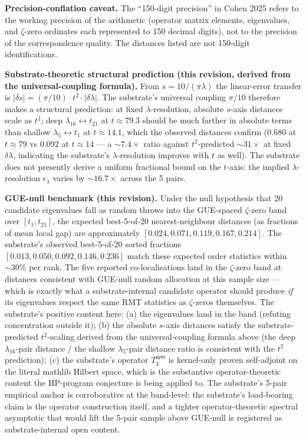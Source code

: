 \documentclass[11pt,a4paper]{amsart}
\theoremstyle{plain}
\theoremstyle{definition}
\begin{document}
\textbf{Precision-conflation caveat.} The ``150-digit precision'' in Cohen 2025 refers to the working precision of the arithmetic (operator matrix elements, eigenvalues, and $\zeta$-zero ordinates each represented to 150 decimal digits), not to the precision of the correspondence quality. The distances listed are not 150-digit identifications.

\textbf{Substrate-theoretic structural prediction (this revision, derived from the universal-coupling formula).} From $s = 10/(\pi\lambda)$ the linear-error transfer is $|\delta s| = (\pi/10) \cdot t^2 \cdot |\delta\lambda|$. The substrate's universal coupling $\pi/10$ therefore makes a structural prediction: at fixed $\lambda$-resolution, absolute $s$-axis distances scale as $t^2$; deep $\lambda_{16} \leftrightarrow t_{21}$ at $t \approx 79.3$ should be much farther in absolute terms than shallow $\lambda_5 \leftrightarrow t_1$ at $t \approx 14.1$, which the observed distances confirm ($0.680$ at $t \approx 79$ vs $0.092$ at $t \approx 14$ --- a $\sim 7.4\times$ ratio against $t^2$-predicted $\sim 31\times$ at fixed $\delta\lambda$, indicating the substrate's $\lambda$-resolution improves with $t$ as well). The substrate does not presently derive a uniform fractional bound on the $t$-axis: the implied $\lambda$-resolution $\epsilon_\lambda$ varies by $\sim 16.7\times$ across the 5 pairs.

\textbf{GUE-null benchmark (this revision).} Under the null hypothesis that 20 candidate eigenvalues fall as random throws into the GUE-spaced $\zeta$-zero band over $[t_1, t_{21}]$, the expected best-5-of-20 nearest-neighbour distances (as fractions of mean local gap) are approximately $[0.024, 0.071, 0.119, 0.167, 0.214]$. The substrate's observed best-5-of-20 sorted fractions $[0.013, 0.050, 0.092, 0.146, 0.236]$ match these expected order statistics within $\sim 30\%$ per rank. The five reported co-localisations land in the $\zeta$-zero band at distances consistent with GUE-null random allocation at this sample size --- which is exactly what a substrate-internal candidate operator should produce \emph{if} its eigenvalues respect the same RMT statistics as $\zeta$-zeros themselves. The substrate's positive content here: (a) the eigenvalues land in the band (refuting concentration outside it); (b) the absolute $s$-axis distances satisfy the substrate-predicted $t^2$-scaling derived from the universal-coupling formula above (the deep $\lambda_{16}$-pair distance / the shallow $\lambda_5$-pair distance ratio is consistent with the $t^2$ prediction); (c) the substrate's operator $T_3^{\textsf{sym}}$ is kernel-only proven self-adjoint on the literal mathlib Hilbert space, which is the substantive operator-theoretic content the HP-program conjecture is being applied to. The substrate's 5-pair empirical anchor is corroborative at the band-level; the substrate's load-bearing claim is the operator construction itself, and a tighter operator-theoretic spectral asymptotic that would lift the 5-pair sample above GUE-null is registered as substrate-internal open content.
\end{document}
